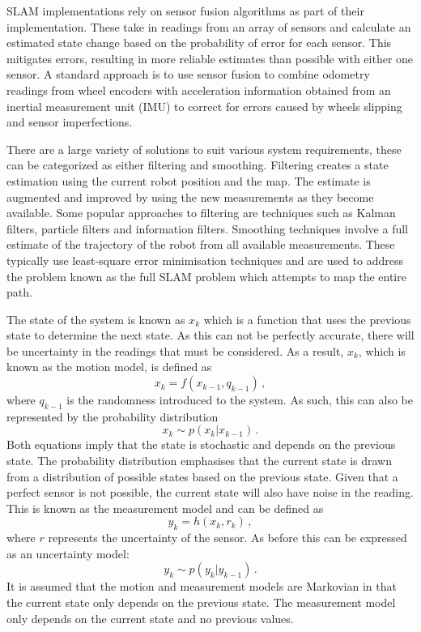 SLAM implementations rely on sensor fusion algorithms as part of their implementation.
These take in readings from an array of sensors and calculate an estimated state change
based on the probability of error for each sensor. This mitigates errors, resulting in more reliable estimates than possible with either one sensor. A standard
approach is to use sensor fusion to combine odometry readings from wheel encoders with
acceleration information obtained from an inertial measurement unit (IMU) to correct for
errors caused by wheels slipping and sensor imperfections.

There are a large variety of solutions to suit various system requirements, these
can be categorized as either filtering and smoothing. Filtering creates a state estimation
using the current robot position and the map. The estimate is augmented and improved
by using the new measurements as they become available. Some popular
approaches to filtering are techniques such as Kalman filters, particle filters
and information filters. Smoothing techniques involve a full estimate of the trajectory of
the robot from all available measurements. These typically use least-square error
minimisation techniques and are used to address the problem known as the full SLAM
problem which attempts to map the entire path.

The state of the system is known as $x_k$ which is a function that uses the previous
state to determine the next state. As this can not be perfectly accurate, there will
be uncertainty in the readings that must be considered. As a result, $x_k$,
which is known as the motion model, is defined as
\begin{equation}
x_{k} = f(x_{k-1}, q_{k-1})\,,
\end{equation}
where $q_{k-1}$ is the randomness introduced to the system. As such, this can
also be represented by the probability distribution
\begin{equation}
x_{k} \sim p(x_{k} | x_{k-1})\,.
\end{equation}
Both equations imply that the state is stochastic and depends on the previous
state. The probability distribution emphasises that the current state is
drawn from a distribution of possible states based on the previous state. Given that a perfect sensor is not possible, the current state will also have noise
in the reading. This is known as the measurement model and can be defined as
\begin{equation}
y_{k} = h(x_{k}, r_{k})\,,
\end{equation}
where $r$ represents the uncertainty of the sensor. As
before this can be expressed as an uncertainty model:
\begin{equation}
y_{k} \sim p(y_{k} | y_{k-1})\,.
\end{equation}
It is assumed that the motion and measurement models are Markovian in that
the current state only depends on the previous state. The measurement model only
depends on the current state and no previous values.

